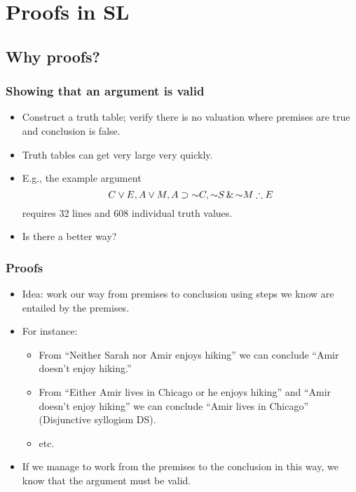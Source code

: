 ﻿%

\setcounter{section}{3}

\section{Proofs in SL}

\subsection{Why proofs?}

\begin{frame}
  \frametitle{Showing that an argument is valid}

  \begin{itemize}[<+->]
    \item Construct a truth table; verify there is no valuation where
    premises are true and conclusion is false.
    \item Truth tables can get very large very quickly.
    \item E.g., the example argument
      \[
      C \eor E, A \eor M, A \eif \enot C, \enot S \eand \enot M \therefore E
      \]
      requires 32 lines and 608 individual truth values.
    \item Is there a better way?
  \end{itemize}
\end{frame}

\begin{frame}
  \frametitle{Proofs}

  \begin{itemize}[<+->]
    \item Idea: work our way from premises to conclusion using steps
    we know are entailed by the premises.
    \item For instance:
      \begin{itemize}[<+->]
        \item From ``Neither Sarah nor Amir enjoys hiking'' we can
        conclude ``Amir doesn't enjoy hiking.''
        \item From ``Either Amir lives in Chicago or he enjoys hiking''
        and ``Amir doesn't enjoy hiking'' we can conclude ``Amir
        lives in Chicago'' (Disjunctive syllogism DS).
        \item etc.
      \end{itemize}
    \item If we manage to work from the premises to the conclusion in
    this way, we know that the argument must be valid.
  \end{itemize}

\end{frame}

